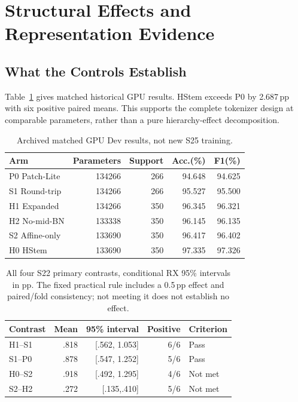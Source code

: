 \documentclass[journal]{IEEEtran}
\begin{document}
\section{Structural Effects and Representation Evidence}
\subsection{What the Controls Establish}
Table~\ref{tab:ablations} gives matched historical GPU results. HStem exceeds P0 by 2.687\,pp with six positive paired means. This supports the complete tokenizer design at comparable parameters, rather than a pure hierarchy-effect decomposition.

\begin{table}[t]\centering
\caption{Archived matched GPU Dev results, not new S25 training.}
\label{tab:ablations}
\begin{tabular}{lrrrr}\toprule
Arm & Parameters & Support & Acc.(\%) & F1(\%)\\\midrule
P0 Patch-Lite &134266&266&94.648&94.625\\
S1 Round-trip &134266&266&95.527&95.500\\
H1 Expanded &134266&350&96.345&96.321\\
H2 No-mid-BN &133338&350&96.145&96.135\\
S2 Affine-only &133690&350&96.417&96.402\\
H0 HStem &133690&350&97.335&97.326\\\bottomrule
\end{tabular}
\end{table}

\begin{table}[t]\centering
\caption{All four S22 primary contrasts, conditional RX 95\% intervals in pp. The fixed practical rule includes a 0.5\,pp effect and paired/fold consistency; not meeting it does not establish no effect.}
\label{tab:contrasts}
\begin{tabular}{lrrrl}\toprule
Contrast&Mean&95\% interval&Positive&Criterion\\\midrule
H1--S1&.818&[.562, 1.053]&6/6&Pass\\
S1--P0&.878&[.547, 1.252]&5/6&Pass\\
H0--S2&.918&[.492, 1.295]&4/6&Not met\\
S2--H2&.272&[.135,.410]&5/6&Not met\\\bottomrule
\end{tabular}
\end{table}
\end{document}
